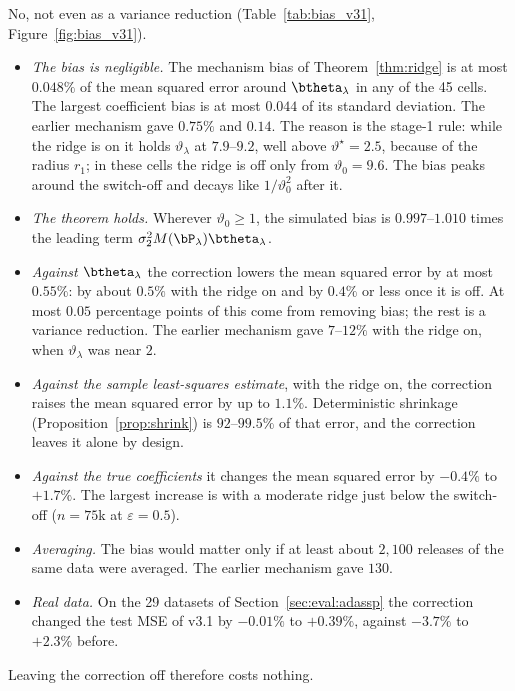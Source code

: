 No, not even as a variance reduction (Table~\ref{tab:bias_v31}, Figure~\ref{fig:bias_v31}).
\begin{itemize}[noitemsep]
  \item \emph{The bias is negligible.} The mechanism bias of Theorem~\ref{thm:ridge} is at most $0.048\%$ of the mean squared error around $\btheta_\lambda$ in any of the 45 cells. The largest coefficient bias is at most $0.044$ of its standard deviation. The earlier mechanism gave $0.75\%$ and $0.14$. The reason is the stage-1 rule: while the ridge is on it holds $\vartheta_\lambda$ at $7.9$--$9.2$, well above $\vartheta^\star = 2.5$, because of the radius $r_1$; in these cells the ridge is off only from $\vartheta_0 = 9.6$. The bias peaks around the switch-off and decays like $1/\vartheta_0^2$ after it.
  \item \emph{The theorem holds.} Wherever $\vartheta_0 \ge 1$, the simulated bias is $0.997$--$1.010$ times the leading term $\sigma_2^2 M(\bP_\lambda)\btheta_\lambda$.
  \item \emph{Against $\btheta_\lambda$} the correction lowers the mean squared error by at most $0.55\%$: by about $0.5\%$ with the ridge on and by $0.4\%$ or less once it is off. At most $0.05$ percentage points of this come from removing bias; the rest is a variance reduction. The earlier mechanism gave $7$--$12\%$ with the ridge on, when $\vartheta_\lambda$ was near $2$.
  \item \emph{Against the sample least-squares estimate}, with the ridge on, the correction raises the mean squared error by up to $1.1\%$. Deterministic shrinkage (Proposition~\ref{prop:shrink}) is $92$--$99.5\%$ of that error, and the correction leaves it alone by design.
  \item \emph{Against the true coefficients} it changes the mean squared error by $-0.4\%$ to $+1.7\%$. The largest increase is with a moderate ridge just below the switch-off ($n = 75$k at $\varepsilon = 0.5$).
  \item \emph{Averaging.} The bias would matter only if at least about $2{,}100$ releases of the same data were averaged. The earlier mechanism gave $130$.
  \item \emph{Real data.} On the 29 datasets of Section~\ref{sec:eval:adassp} the correction changed the test MSE of v3.1 by $-0.01\%$ to $+0.39\%$, against $-3.7\%$ to $+2.3\%$ before.
\end{itemize}
Leaving the correction off therefore costs nothing.

